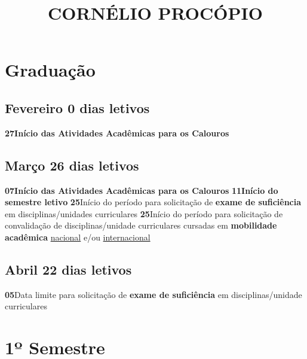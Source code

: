 \documentclass[thesis]{hmcposter}
\author{ }
\title{CORNÉLIO PROCÓPIO}
\begin{document}
\begin{poster}
\normalsize\section{\color{hmcorange}Graduação}\subsection{Fevereiro \hfill 0 dias letivos}\textbf{27}\qquad \textbf{Início das Atividades Acadêmicas para os Calouros} \newline \null\subsection{Março \hfill 26 dias letivos}\textbf{07}\qquad \textbf{Início das Atividades Acadêmicas para os Calouros} \newline \null\textbf{11}\qquad \textbf{Início do semestre letivo} \newline \null\textbf{25}\qquad Início do período para solicitação de \textbf{exame de suficiência} em disciplinas/unidades curriculares \newline \null\textbf{25}\qquad Início do período para solicitação de convalidação de disciplinas/unidade curriculares cursadas em \textbf{mobilidade acadêmica} \underline{nacional} e/ou \underline{internacional} \newline \null\subsection{Abril \hfill 22 dias letivos}\textbf{05}\qquad Data limite para solicitação de \textbf{exame de suficiência} em disciplinas/unidade curriculares \newline \null\vfill\null
\columnbreak
\section{\hfill \color{hmcorange}1º Semestre}

\end{poster}
\end{document}
